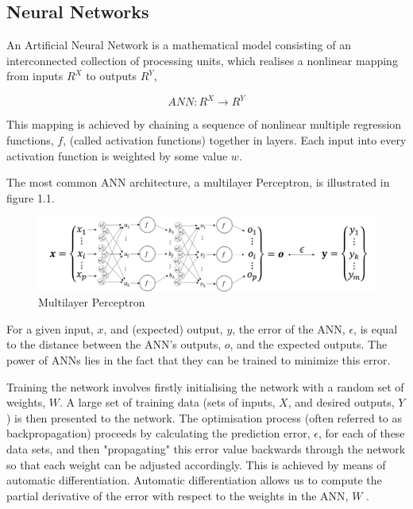 \documentclass[11pt,oneside,openany,a4paper,english, report, goldenblock
]{usthesis}
\begin{document}
\subsection{Neural Networks}
An Artificial Neural Network is a mathematical model consisting of an interconnected collection of processing units, which realises a nonlinear mapping from inputs $R^X$ to outputs $R^Y$,

\begin{equation}
	ANN: R^X \rightarrow R^Y
\end{equation}

This mapping is achieved by chaining a sequence of nonlinear multiple regression functions, $f$, (called activation functions) together in layers.  Each input into every activation function is weighted by some value $w$.


The most common ANN architecture, a multilayer Perceptron, is illustrated in figure 1.1.

\begin{figure}[h]
	\centering
	\includegraphics[width=1\linewidth]{NeuralNetwork}
	\caption[Multilayer Perceptron]{Multilayer Perceptron}
	\label{fig:neuralnetwork}
\end{figure}

For a given input, $x$, and (expected) output, $y$, the error of the ANN, $ \epsilon $, is equal to the distance between the ANN's outputs, $o$, and the expected outputs. The power of ANNs lies in the fact that they can be trained to minimize this error. 


Training the network involves firstly initialising the network with a random set of weights, $W$. A large set of training data (sets of inputs, $X$, and desired outputs, $Y$) is then presented to the network. The optimisation process (often referred to as backpropagation) proceeds by calculating the prediction error, $ \epsilon $, for each of these data sets, and then "propagating" this error value backwards through the network so that each weight can be adjusted accordingly. This is achieved by means of automatic differentiation. Automatic differentiation allows us to compute the partial derivative of the error with respect to the weights in the ANN, $W$ \citep{Werbos}.
\end{document}
